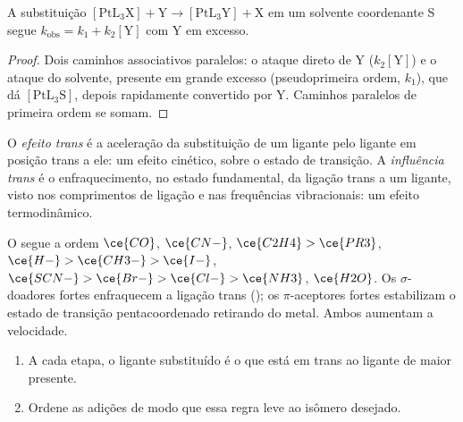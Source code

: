 \begin{proposition}\label{prop:b3:complex-mechanisms:square-planar}
A substituição $\mathrm{[PtL_3X] + Y \to [PtL_3Y] + X}$ em um solvente coordenante S segue
$k_{\mathrm{obs}} = k_1 + k_2[\mathrm Y]$ com Y em excesso.
\end{proposition}

\begin{proof}
Dois caminhos associativos paralelos: o ataque direto de Y ($k_2[\mathrm Y]$) e o ataque do
solvente, presente em grande excesso (pseudoprimeira ordem, $k_1$), que dá $[\mathrm{PtL_3S}]$, depois
rapidamente convertido por Y. Caminhos paralelos de primeira ordem se somam.
\end{proof}

\begin{definition}\label{def:b3:complex-mechanisms:trans-effect}
O \emph{efeito trans} é a aceleração da substituição
de um ligante pelo ligante em posição trans a ele: um efeito cinético, sobre o estado de transição.
A \emph{influência trans} é o enfraquecimento, no estado
fundamental, da ligação trans a um ligante, visto nos comprimentos de ligação e nas
frequências vibracionais: um efeito termodinâmico.
\end{definition}

O  segue a ordem $\ce{CO}$, $\ce{CN-}$, $\ce{C2H4} > \ce{PR3}$, $\ce{H-} > \ce{CH3-} > \ce{I-}$, $\ce{SCN-} >
\ce{Br-} > \ce{Cl-} > \ce{NH3}$, $\ce{H2O}$. Os $\sigma$-doadores fortes enfraquecem a ligação trans ();
os $\pi$-aceptores fortes estabilizam o estado de transição pentacoordenado retirando
 do metal. Ambos aumentam a velocidade.

\begin{method}\label{met:b3:complex-mechanisms:pt-synthesis}
\begin{enumerate}
  \item A cada etapa, o ligante substituído é o que está em trans ao ligante de
        maior  presente.
  \item Ordene as adições de modo que essa regra leve ao isômero desejado.
\end{enumerate}
\end{method}

